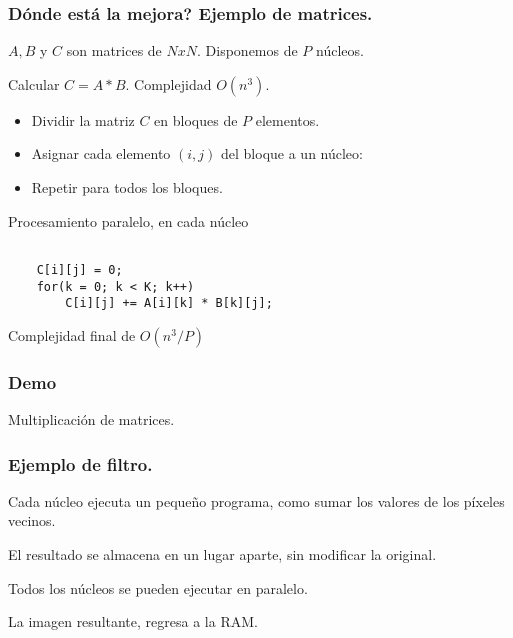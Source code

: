 \documentclass{beamer}
\begin{document}
\begin{frame}
\frametitle{Dónde está la mejora? Ejemplo de matrices.}

$A, B$ y $C$ son matrices de $NxN$. Disponemos de $P$ núcleos.

Calcular $C = A * B$. Complejidad $ O(n^3) $.


\begin{itemize}
\item Dividir la matriz $C$ en bloques de $P$ elementos.
\item Asignar cada elemento $(i,j)$ del bloque a un núcleo:
\item Repetir para todos los bloques.
\end{itemize}

\end{frame}



\begin{frame}[fragile]
Procesamiento paralelo, en cada núcleo

\begin{lstlisting}

    C[i][j] = 0;
    for(k = 0; k < K; k++)
        C[i][j] += A[i][k] * B[k][j];

\end{lstlisting}

Complejidad final de $ O(n^3 / P) $

\end{frame}



\begin{frame}
\frametitle{Demo}
Multiplicación de matrices.
\end{frame}



\begin{frame}

\frametitle{Ejemplo de filtro.}

Cada núcleo ejecuta un pequeño programa, como sumar los valores
de los píxeles vecinos.

El resultado se almacena en un lugar aparte, sin modificar la original.

Todos los núcleos se pueden ejecutar en paralelo.

La imagen resultante, regresa a la RAM.

\end{frame}



\end{document}
